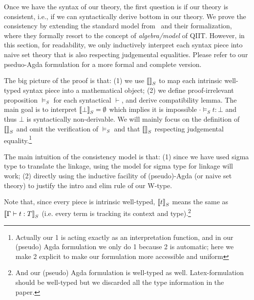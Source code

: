 
\newcommand{\goodCtxS}[2]{{ {#1} \ \models_S }}
\newcommand{\goodTypeS}[3]{{ {#1} \models_S {#2} }}
\newcommand{\goodTermS}[3]{{ {#1} \models_S {#2} : {#3} }}
\newcommand{\goodSubS}[3]{{ {#1} \models_S {#2} : {#3} }}
\newcommand{\goodSigS}[3]{{ {#1} \models_S {#2} \ \  \texttt{LSig}^{#3} }}
\newcommand{\goodWSigS}[3]{{ {#1} \models_S {#2} \ \ \texttt{WSig}^{#3} }}
\newcommand{\goodSealS}[4]{{ {#1} \models_S {#2} : {#3} \  |\  {#4} }}
\newcommand{\goodInhS}[4]{{ {#1} \models_S {#2} : {#3} \twoheadrightarrow {#4}}}

Once we have the syntax of our theory, the first question is if our theory is consistent, i.e., if we can syntactically derive bottom in our theory. We prove the consistency by extending the standard model from~\cite{altkap2016,kaposi2017type, kaposi2019gluing} and their formalization, where they formally resort to the concept of \textit{algebra/model} of QIIT. However, in this section, for readability, we only inductively interpret each syntax piece into naive set theory that is also respecting judgemental equalities. Please refer to our pseduo-Agda formulation for a more formal and complete version.

The big picture of the proof is that: (1) we use ${\llbracket {} \rrbracket}_S$ to map each intrinsic well-typed syntax piece into a mathematical object; (2) we define proof-irrelevant proposition $\models_S$ for each syntactical $\vdash$, and derive compatibility lemma. The main goal is to interpret ${\llbracket {\bot} \rrbracket}_S = \emptyset$ which implies it is impossible $\goodTermS{\cdot}{t}{\bot}$ and thus $\bot$ is syntactically non-derivable. We will mainly focus on the definition of ${\llbracket {} \rrbracket}_S$ and omit the verification of $\models_S$ and that ${\llbracket {} \rrbracket}_S$ respecting judgemental equality.\footnote{Actually our 1 is acting exactly as an interpretation function, and in our (pseudo) Agda formulation we only do 1 because 2 is automatic; here we make 2 explicit to make our formulation more accessible and uniform}


The main intuition of the consistency model is that: (1) since we have used sigma type to translate the linkage, using the model for sigma type for linkage will work; (2) directly using the inductive facility of (pseudo)-Agda (or naive set theory) to justify the intro and elim rule of our W-type.

Note that, since every piece is intrinsic well-typed, ${\llbracket {t} \rrbracket}_S$ means the same as ${\llbracket {\ensuremath{ {\Gamma} \vdash {t} : {T} }} \rrbracket}_S$ (i.e. every term is tracking its context and type).\footnote{And our (pseudo) Agda formulation is well-typed as well. Latex-formulation should be well-typed but we discarded all the type information in the paper.}

